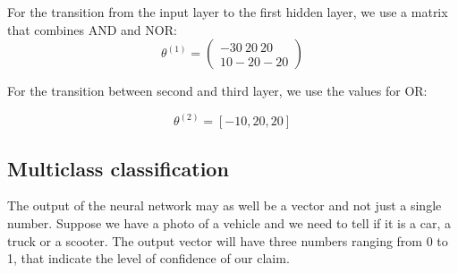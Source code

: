 \documentclass{article}
\begin{document}
For the transition from the input layer to the first hidden layer, we use a matrix
that combines AND and NOR:
$$ \theta^{(1)} = \begin{pmatrix} -30\ 20\ 20\\ 10 -20 -20\end{pmatrix} $$

For the transition between second and third layer, we use the values for OR:

$$ \theta^{(2)} = [-10,20,20]$$

\subsection{Multiclass classification}

The output of the neural network may as well be a vector and not just a single
number. Suppose we have a photo of a vehicle and we need to tell if it is a car,
a truck or a scooter. The output vector will have three numbers ranging from 0
to 1, that indicate the level of confidence of our claim.
\end{document}
